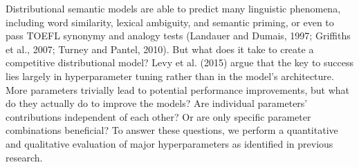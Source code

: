 Distributional semantic models are able to predict many linguistic phenomena, including word similarity, lexical ambiguity, and semantic priming, or even to pass TOEFL synonymy and analogy tests (Landauer and Dumais, 1997; Griffiths et al., 2007; Turney and Pantel, 2010). But what does it take to create a competitive distributional model? Levy et al. (2015) argue that the key to success lies largely in hyperparameter tuning rather than in the model's architecture. More parameters trivially lead to potential performance improvements, but what do they actually do to improve the models? Are individual parameters' contributions independent of each other? Or are only specific parameter combinations beneficial? To answer these questions, we perform a quantitative and qualitative evaluation of major hyperparameters as identified in previous research.
